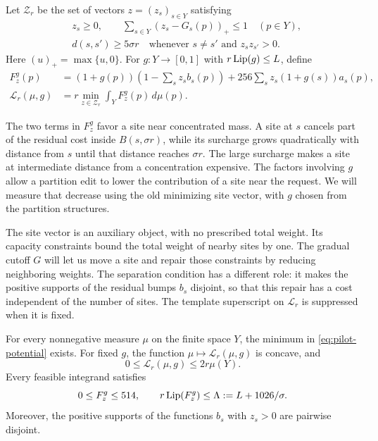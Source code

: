 Let $\mathcal Z_r$ be the set of vectors $z=(z_s)_{s\in Y}$ satisfying
\begin{equation}
 \begin{split}
 &z_s\ge0,\qquad
   \sum_{s\in Y}(z_s-G_s(p))_+\le1\quad(p\in Y),\\
 &d(s,s')\ge5\sigma r
       \quad\text{whenever }s\ne s'\text{ and }z_sz_{s'}>0.
 \end{split}
 \label{eq:pilot-feasible}
\end{equation}
Here $(u)_+=\max\{u,0\}$.  For $g:Y\to[0,1]$ with
$r\operatorname{Lip}(g)\le L$, define
\begin{align}
 F_z^g(p)
   &=(1+g(p))\left(1-\sum_s z_sb_s(p)\right)
       +256\sum_s z_s(1+g(s))a_s(p),
       \label{eq:pilot-integrand}\\
 \mathcal L_r(\mu,g)
   &=r\min_{z\in\mathcal Z_r}\int_Y F_z^g(p)\,d\mu(p).
       \label{eq:pilot-potential}
\end{align}

The two terms in $F_z^g$ favor a site near concentrated mass.  A site at
$s$ cancels part of the residual cost inside $B(s,\sigma r)$, while its
surcharge grows quadratically with distance from $s$ until that distance
reaches $\sigma r$.  The large surcharge makes a site at intermediate
distance from a concentration expensive.  The factors involving $g$
allow a partition edit to lower the contribution of a site near the
request.  We will measure that decrease using the old minimizing site
vector, with $g$ chosen from the partition structures.

The site vector is an auxiliary object, with no prescribed total weight.
Its capacity constraints bound the total weight of nearby sites by one.
The gradual cutoff $G$ will let us move a site and repair those constraints
by reducing neighboring weights.  The separation condition has a different
role: it makes the positive supports of the residual bumps $b_s$ disjoint,
so that this repair has a cost independent of the number of sites.
The template superscript on $\mathcal L_r$ is suppressed when it is fixed.

\begin{lemma}
\label{lem:pilot-compact}
For every nonnegative measure $\mu$ on the finite space $Y$, the minimum
in \eqref{eq:pilot-potential} exists.  For fixed $g$, the function
$\mu\mapsto\mathcal L_r(\mu,g)$ is concave, and
\begin{equation}
 0\le\mathcal L_r(\mu,g)\le2r\mu(Y).
 \label{eq:pilot-size}
\end{equation}
Every feasible integrand satisfies
\begin{equation}
 0\le F_z^g\le514,\qquad
 r\operatorname{Lip}(F_z^g)\le\Lambda:=L+1026/\sigma.
 \label{eq:pilot-global-bounds}
\end{equation}
Moreover, the positive supports of the functions $b_s$ with $z_s>0$
are pairwise disjoint.
\end{lemma}

